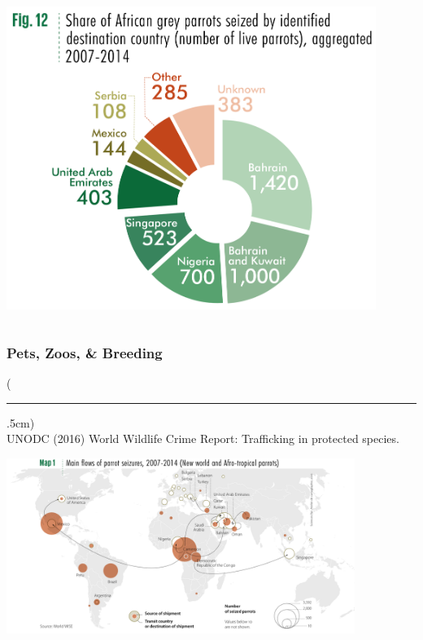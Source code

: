 \documentclass[10pt]{beamer}
\newenvironment{reference}[2]{%
	\begin{textblock*}{\textwidth}(#1,#2)
		\tiny\bgroup\color{gray}}{\egroup\end{textblock*}}
\begin{document}
\begin{frame}[t]
\begin{columns}
			\begin{column}{0.5\textwidth}
				\begin{center}
					\includegraphics[width=0.9\textwidth]{figures/parrot_illegal_import.png}
				\end{center}
			\end{column}
		\end{columns}
\end{frame}	


\begin{frame}[t]
\frametitle{Pets, Zoos, \& Breeding}
\vspace{0.5cm}

	\begin{reference}{4mm}{92mm}
		\rule{1.5cm}{0.25pt}\\
		UNODC (2016) World Wildlife Crime Report: Trafficking in protected species.
	\end{reference}
	
		\begin{center}
			\includegraphics[width=0.85\textwidth]{figures/map6a.png}
		\end{center}
\end{frame}	
\end{document}
